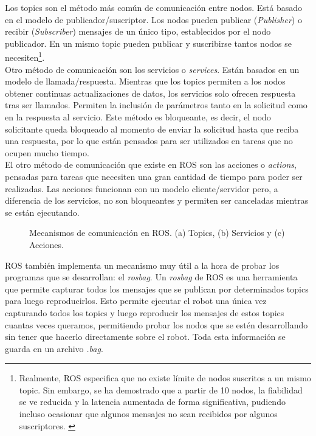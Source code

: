 Los topics son el método más común de comunicación entre nodos. Está basado en el modelo de publicador/suscriptor. Los nodos pueden publicar (\textit{Publisher}) o recibir (\textit{Subscriber}) mensajes de un único tipo, establecidos por el nodo publicador. En un mismo topic pueden publicar y suscribirse tantos nodos se necesiten\footnote{Realmente, ROS especifica que no existe límite de nodos suscritos a un mismo topic. Sin embargo, se ha demostrado que a partir de 10 nodos, la fiabilidad se ve reducida y la latencia aumentada de forma significativa, pudiendo incluso ocasionar que algunos mensajes no sean recibidos por algunos suscriptores. \cite{issue}}. \\

Otro método de comunicación son los servicios o \textit{services}. Están basados en un modelo de llamada/respuesta. Mientras que los topics permiten a los nodos obtener continuas actualizaciones de datos, los servicios solo ofrecen respuesta tras ser llamados. Permiten la inclusión de parámetros tanto en la solicitud como en la respuesta al servicio. Este método es bloqueante, es decir, el nodo solicitante queda bloqueado al momento de enviar la solicitud hasta que reciba una respuesta, por lo que están pensados para ser utilizados en tareas que no ocupen mucho tiempo.\\

El otro método de comunicación que existe en ROS son las acciones o \textit{actions}, pensadas para tareas que necesiten una gran cantidad de tiempo para poder ser realizadas. Las acciones funcionan con un modelo cliente/servidor pero, a diferencia de los servicios, no son bloqueantes y permiten ser canceladas mientras se están ejecutando.\\

\begin{figure}[H]
 \centering
  \hspace{0.5cm}
 \caption{Mecanismos de comunicación en ROS. (a) Topics, (b) Servicios y (c) Acciones. \cite{roswiki}}
 \label{fig:comm}
\end{figure}

ROS también implementa un mecanismo muy útil a la hora de probar los programas que se desarrollan: el \textit{rosbag}. Un \textit{rosbag} de ROS es una herramienta que permite capturar todos los mensajes que se publican por determinados topics para luego reproducirlos. Esto permite ejecutar el robot una única vez capturando todos los topics y luego reproducir los mensajes de estos topics cuantas veces queramos, permitiendo probar los nodos que se estén desarrollando sin tener que hacerlo directamente sobre el robot. Toda esta información se guarda en un archivo \textit{.bag}. \cite{roswiki}\\

